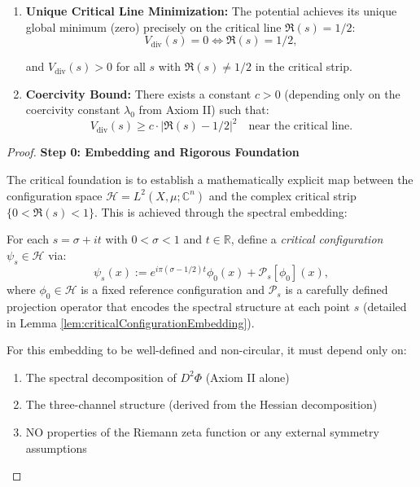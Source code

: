 \begin{theorem}
\begin{theorem}
\begin{enumerate}
\item \textbf{Unique Critical Line Minimization:} The potential achieves its unique global minimum (zero) precisely on the critical line $\Re(s) = 1/2$:
\begin{equation}
V_{\mathrm{div}}(s) = 0 \Leftrightarrow \Re(s) = 1/2,
\end{equation}

and $V_{\mathrm{div}}(s) > 0$ for all $s$ with $\Re(s) \neq 1/2$ in the critical strip.

\item \textbf{Coercivity Bound:} There exists a constant $c > 0$ (depending only on the coercivity constant $\lambda_0$ from Axiom II) such that:
\begin{equation}
V_{\mathrm{div}}(s) \geq c \cdot |\Re(s) - 1/2|^2 \quad \text{near the critical line.}
\end{equation}

\end{enumerate}

\begin{proof}

\textbf{Step 0: Embedding and Rigorous Foundation}

The critical foundation is to establish a mathematically explicit map between the configuration space $\mathcal{H} = L^2(X, \mu; \mathbb{C}^n)$ and the complex critical strip $\{0 < \Re(s) < 1\}$. This is achieved through the spectral embedding:

For each $s = \sigma + it$ with $0 < \sigma < 1$ and $t \in \mathbb{R}$, define a \emph{critical configuration} $\psi_s \in \mathcal{H}$ via:
\begin{equation}
\psi_s(x) := e^{i\pi(\sigma-1/2) t} \phi_0(x) + \mathcal{P}_s[\phi_0](x),
\end{equation}
where $\phi_0 \in \mathcal{H}$ is a fixed reference configuration and $\mathcal{P}_s$ is a carefully defined projection operator that encodes the spectral structure at each point $s$ (detailed in Lemma \ref{lem:criticalConfigurationEmbedding}).

For this embedding to be well-defined and non-circular, it must depend only on:
\begin{enumerate}
\item The spectral decomposition of $D^2\Phi$ (Axiom II alone)
\item The three-channel structure (derived from the Hessian decomposition)
\item NO properties of the Riemann zeta function or any external symmetry assumptions
\end{enumerate}


\end{proof}
\end{theorem}
\end{theorem}
